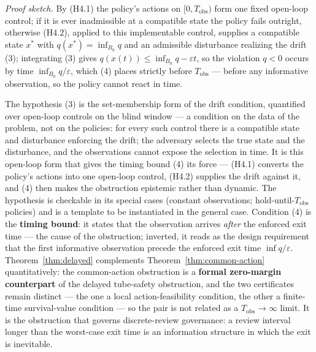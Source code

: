 \documentclass[10pt,twocolumn]{article}
\theoremstyle{definition}
\begin{document}
\emph{Proof sketch.} By (H4.1) the policy's actions on \([0, T_{\mathrm{obs}})\) form one fixed open-loop control; if it is ever inadmissible at a compatible state the policy fails outright, otherwise (H4.2), applied to this implementable control, supplies a compatible state \(x^*\) with \(q(x^*) = \inf_{B_0} q\) and an admissible disturbance realizing the drift (3); integrating (3) gives \(q(x(t)) \le \inf_{B_0} q - \varepsilon t\), so the violation \(q < 0\) occurs by time \(\inf_{B_0} q / \varepsilon\), which (4) places strictly before \(T_{\mathrm{obs}}\) --- before any informative observation, so the policy cannot react in time.

The hypothesis (3) is the set-membership form of the drift condition,
quantified over open-loop controls on the blind window --- a condition
on the data of the problem, not on the policies: for every such control
there is a compatible state and disturbance enforcing the drift; the
adversary selects the true state and the disturbance, and the
observations cannot expose the selection in time. It is this open-loop form that gives the timing bound (4) its force --- (H4.1) converts
the policy's actions into one open-loop control, (H4.2) supplies the
drift against it, and (4) then makes the obstruction epistemic rather
than dynamic. The hypothesis is checkable in its special cases (constant
observations; hold-until-\(T_{\mathrm{obs}}\) policies) and is a template to be instantiated in the general case. Condition (4) is
the \textbf{timing bound}: it states that the observation arrives
\emph{after} the enforced exit time --- the cause of the obstruction; inverted, it reads as the design requirement that the first informative observation precede the enforced exit time
\(\inf q / \varepsilon\). Theorem~\ref{thm:delayed} complements Theorem~\ref{thm:common-action} quantitatively:
the common-action obstruction is a \textbf{formal zero-margin counterpart}
of the delayed tube-safety obstruction, and the two certificates remain
distinct --- the one a local action-feasibility condition, the other a
finite-time survival-value condition --- so the pair is not related as a
\(T_{\mathrm{obs}} \to \infty\) limit. It is the obstruction that
governs discrete-review governance: a review interval longer than the
worst-case exit time is an information structure in which the exit is inevitable.
\end{document}
